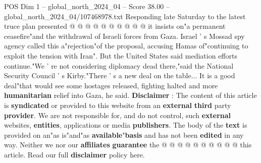 \begin{textsample}{POS Dim 1 – global\_north\_2024\_04 – Score 38.00 – global\_north\_2024\_04/107468978.txt}
Responding late Saturday to the latest truce plan presented @ @ @ @ @ @ @ @ @ @ it insists on"a permanent ceasefire"and the withdrawal of Israeli forces from Gaza.
Israel ' s Mossad spy agency called this a"rejection"of the proposal, accusing Hamas of"continuing to exploit the tension with Iran".
But the United States said mediation efforts continue."We ' re not considering diplomacy dead there,"said the National Security Council ' s Kirby."There ' s a new deal on the table...
It is a good deal"that would see some hostages released, fighting halted and more \textbf{humanitarian} relief into Gaza, he said. \textbf{Disclaimer} : The content of this article is \textbf{syndicated} or provided to this website from an \textbf{external} \textbf{third} party \textbf{provider}.
We are not responsible for, and do not control, such \textbf{external} websites, \textbf{entities}, applications or media \textbf{publishers}.
The body of the \textbf{text} is provided on an"as is"and"as \textbf{available}"\textbf{basis} and has not been \textbf{edited} in any way.
Neither we nor our \textbf{affiliates} \textbf{guarantee} the @ @ @ @ @ @ @ @ @ @ this article.
Read our full \textbf{disclaimer} policy here.

\end{textsample}
